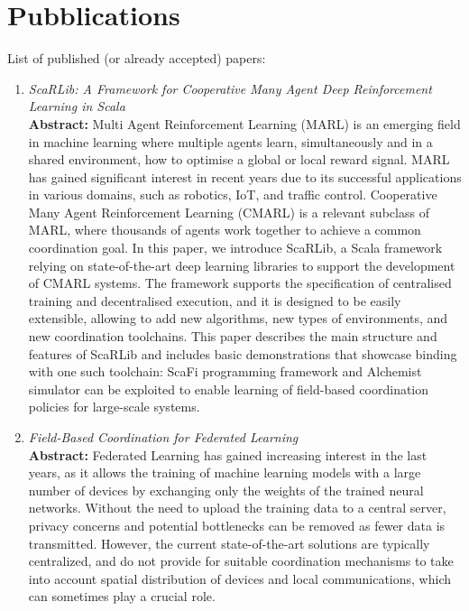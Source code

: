 \documentclass[runningheads]{llncs}
\begin{document}
\section{Pubblications}
List of published (or already accepted) papers:
\begin{enumerate}
    \item \emph{ScaRLib: A Framework for Cooperative Many Agent Deep Reinforcement Learning in Scala}~\cite{DBLP:conf/coordination/DominiCAV23} \\
    \textbf{Abstract: }
    Multi Agent Reinforcement Learning (MARL) is an emerging field in machine learning where multiple agents learn, simultaneously and in a shared environment, 
     how to optimise a global or local reward signal. MARL has gained significant interest in recent years due to its successful applications in various domains,
     such as robotics, IoT, and traffic control. Cooperative Many Agent Reinforcement Learning (CMARL) is a relevant subclass of MARL, where thousands of 
     agents work together to achieve a common coordination goal.
    In this paper, we introduce ScaRLib, a Scala framework relying on state-of-the-art deep learning libraries to support the development of CMARL systems. 
    The framework supports the specification of centralised training and decentralised execution, and it is designed to be easily extensible, allowing to add new 
     algorithms, new types of environments, and new coordination toolchains.
    This paper describes the main structure and features of ScaRLib and includes basic demonstrations that showcase binding with one such toolchain: 
     ScaFi programming framework and Alchemist simulator can be exploited to enable learning of field-based coordination policies for large-scale systems.
    \item \emph{Field-Based Coordination for Federated Learning}~\cite{DBLP:conf/coordination/DominiAEV24} \\
    \textbf{Abstract: }
    Federated Learning has gained increasing interest in the last years, as it allows the training of machine learning models with a large number of devices 
     by exchanging only the weights of the trained neural networks. 
    Without the need to upload the training data to a central server, privacy concerns and potential bottlenecks can be removed as fewer data is transmitted. 
    However, the current state-of-the-art solutions are typically centralized, and do not provide for suitable coordination mechanisms to take into account 
     spatial distribution of devices and local communications, which can sometimes play a crucial role. 

\end{enumerate}
\end{document}
